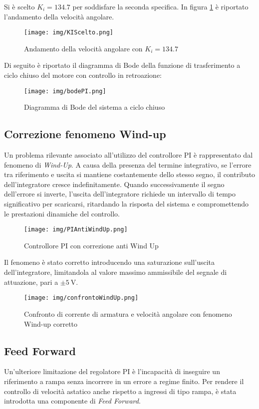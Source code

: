 \documentclass{article}
\begin{document}
Si è scelto $K_i=134.7$ per soddisfare la seconda specifica. In figura \ref{fig:ki_scelto} è riportato l'andamento della velocità angolare.

\begin{figure}[h!]
\centering
\texttt{[image: img/KIScelto.png]}
\caption{Andamento della velocità angolare con $K_i=134.7$}
\label{fig:ki_scelto}
\end{figure}

Di seguito è riportato il diagramma di Bode della funzione di trasferimento a ciclo chiuso del motore con controllo in retroazione:

\begin{figure}[h!]
\centering
\texttt{[image: img/bodePI.png]}
\caption{Diagramma di Bode del sistema a ciclo chiuso}
\label{fig:bode}
\end{figure}

\newpage

\subsection{Correzione fenomeno Wind-up}
Un problema rilevante associato all’utilizzo del controllore PI è rappresentato dal fenomeno di \textit{Wind-Up}. A causa della presenza del termine integrativo, se l’errore tra riferimento e uscita si mantiene costantemente dello stesso segno, il contributo dell’integratore cresce indefinitamente. Quando successivamente il segno dell’errore si inverte, l’uscita dell’integratore richiede un intervallo di tempo significativo per scaricarsi, ritardando la risposta del sistema e compromettendo le prestazioni dinamiche del controllo.

\begin{figure}[h!]
\centering
\texttt{[image: img/PIAntiWindUp.png]}
\caption{Controllore PI con correzione anti Wind Up}
\label{fig:wu}
\end{figure}
Il fenomeno è stato corretto introducendo una saturazione sull’uscita dell’integratore, limitandola al valore massimo ammissibile del segnale di attuazione, pari a $\pm 5~\text{V}$.

\begin{figure}[h!]
\centering
\texttt{[image: img/confrontoWindUp.png]}
\caption{Confronto di corrente di armatura e velocità angolare con fenomeno Wind-up corretto}
\label{fig:wuc}
\end{figure}

\subsection{Feed Forward}
Un’ulteriore limitazione del regolatore PI è l’incapacità di inseguire un riferimento a rampa senza incorrere in un errore a regime finito. Per rendere il controllo di velocità astatico anche rispetto a ingressi di tipo rampa, è stata introdotta una componente di \textit{Feed Forward}.
\end{document}
